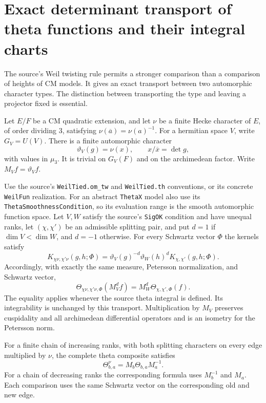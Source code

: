 \section{Exact determinant transport of theta functions and their integral charts}
\label{sec:cubic-theta-transport}

The source's Weil twisting rule permits a stronger comparison than
a comparison of heights of CM models.  It gives an exact transport
between two automorphic character types.  The distinction between
transporting the type and leaving a projector fixed is essential.

\begin{theorem}
\label{AC-G42}
Let $E/F$ be a CM quadratic extension, and let $\nu$ be a
finite Hecke character of $E$, of order dividing $3$, satisfying
$\nu(\overline a)=\nu(a)^{-1}$.  For a hermitian space $V$,
write $G_V=U(V)$.  There is a finite automorphic character
\[
 \vartheta_V(g)=\nu(x),\qquad
       x/\overline x=\det g,                             \tag{G42.1}
\]
with values in $\mu_3$.  It is trivial on $G_V(F)$ and on
the archimedean factor.  Write $M_Vf=\vartheta_V f$.

Use the source's \texttt{WeilTied.om\_tw} and
\texttt{WeilTied.th} conventions, or its concrete
\texttt{WeilFun} realization.  For an abstract
\texttt{ThetaX} model also use its
\texttt{ThetaSmoothnessCondition}, so its evaluation
range is the smooth automorphic function space.
Let $V,W$ satisfy the source's \texttt{SigOK} condition
and have unequal ranks, let $(\chi,\chi')$ be an admissible splitting pair,
and put
$d=1$ if $\dim V<\dim W$, and $d=-1$ otherwise.
For every Schwartz vector $\Phi$ the kernels satisfy
\[
 K_{\chi\nu,\chi'\nu}(g,h;\Phi)
       =\vartheta_V(g)^{-d}\vartheta_W(h)^d
                       K_{\chi,\chi'}(g,h;\Phi).        \tag{G42.2}
\]
Accordingly, with exactly the same measure, Petersson
normalization, and Schwartz vector,
\[
 \Theta_{\chi\nu,\chi'\nu,\Phi}(M_V^d f)
          =M_W^d\Theta_{\chi,\chi',\Phi}(f).             \tag{G42.3}
\]
The equality applies whenever the source theta integral is
defined.  Its integrability is unchanged by this transport.
Multiplication by $M_V$ preserves cuspidality and all
archimedean differential operators and is an isometry for
the Petersson norm.

For a finite chain of increasing ranks, with both splitting
characters on every edge multiplied by $\nu$, the complete
theta composite satisfies
\[
        \Theta^{\nu}_{b,a}=M_b\Theta_{b,a}M_a^{-1}.
                                                               \tag{G42.4}
\]
For a chain of decreasing ranks the corresponding formula
uses $M_b^{-1}$ and $M_a$.  Each comparison uses the same
Schwartz vector on the corresponding old and new edge.
\end{theorem}
